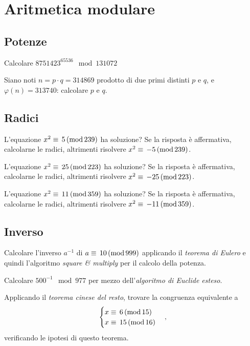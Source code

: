 
\chapter{Aritmetica modulare}

    \bigskip
    \section{Potenze}
        Calcolare $8751423^{65536} \mod 131072$

        Siano noti $n=p\cdot q =314869$ prodotto di due primi distinti $p$ e $q$, e $\varphi(n)=313740$: calcolare 
        $p$ e $q$.

    \bigskip
    \section{Radici}
        L'equazione $x^2\equiv\,5\,(\mathrm{mod}\,239)$ ha soluzione? Se la risposta è affermativa, calcolarne 
        le radici, altrimenti risolvere $x^2\equiv\,-5\,(\mathrm{mod}\,239)$.

        L'equazione $x^2\equiv\,25\,(\mathrm{mod}\,223)$ ha soluzione? Se la risposta è affermativa, calcolarne 
        le radici, altrimenti risolvere $x^2\equiv\,-25\,(\mathrm{mod}\,223)$.

        L'equazione $x^2\equiv\,11\,(\mathrm{mod}\,359)$ ha soluzione? Se la risposta è affermativa, calcolarne 
        le radici, altrimenti risolvere $x^2\equiv\,-11\,(\mathrm{mod}\,359)$.

    \bigskip
    \section{Inverso}
        Calcolare l'inverso $a^{-1}$ di $a\equiv\,10\,(\mathrm{mod}\,999)$ applicando il \emph{teorema di Eulero} 
        e quindi l'algoritmo \emph{square \& multiply} per il calcolo della potenza.

        Calcolare $500^{-1} \mod 977$ per mezzo dell'\emph{algoritmo di Euclide esteso}.

        Applicando il \emph{teorema cinese del resto}, trovare la congruenza equivalente a \[
        \begin{cases}
            x\equiv\,6\,(\mathrm{mod}\,15) \\
            x\equiv\,15\,(\mathrm{mod}\,16)
        \end{cases}
        ,\] verificando le ipotesi di questo teorema.

